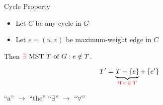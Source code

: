 
\begin{frame}{}
  \centerline{}
\end{frame}

\begin{frame}{}
  \begin{block}{Cycle Property}
    \begin{itemize}
      \item Let $C$ be any cycle in $G$
      \item Let $e = (u,v)$ be  maximum-weight edge in $C$
    \end{itemize}

    \centerline{Then $\textcolor{red}{\exists} \text{ MST } T \text{ of } G: e \notin T$.}
  \end{block}


  \pause
  \vspace{-0.30cm}
  \[
    T' = \underbrace{T - \left\{e\right\}}_{\textcolor{red}{\text{if } e \;\in\; T}} + \left\{e'\right\}
  \]

  \pause
  \centerline{``a'' $\to$ ``the'' \red{$\implies$} ``$\exists$'' $\to$ ``$\forall$''}
\end{frame}


